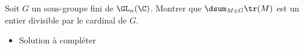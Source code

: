 \begin{enonce}
\begin{exercise}[ID={RMS134 E571},subtitle={Oral
    Mines-Ponts},theme={algebre},annee={2023},concours={mines-ponts},filiere={MP}, difficulty={0}]
Soit $G$ un sous-groupe fini de $\GL_n(\C)$. Montrer que $\dsum_{M\in
  G}\tr(M)$ est un entier divisible par le cardinal de $G$.
\end{exercise}
\begin{solution}
  \begin{itemize}
  \item Solution à compléter
  \end{itemize}
\end{solution}
\end{enonce}